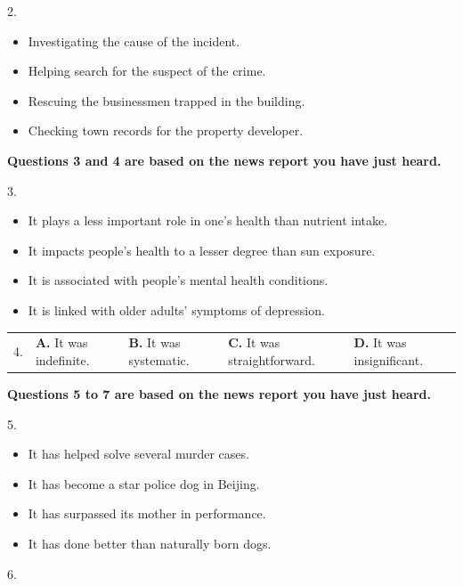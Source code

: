 \documentclass[UTF8,11pt]{ctexart}
\begin{document}
2.


\begin{itemize}[leftmargin=2em,itemsep=.2em,topsep=.4em]\item[A.] Investigating the cause of the incident.
\item[B.] Helping search for the suspect of the crime.
\item[C.] Rescuing the businessmen trapped in the building.
\item[D.] Checking town records for the property developer.
\end{itemize}

\textbf{Questions 3 and 4 are based on the news report you have just heard.}


3.


\begin{itemize}[leftmargin=2em,itemsep=.2em,topsep=.4em]\item[A.] It plays a less important role in one’s health than nutrient intake.
\item[B.] It impacts people’s health to a lesser degree than sun exposure.
\item[C.] It is associated with people’s mental health conditions.
\item[D.] It is linked with older adults’ symptoms of depression.
\end{itemize}

\noindent\begin{tabularx}{\linewidth}{@{}lXXXX@{}}4. & \textbf{A.} It was indefinite. & \textbf{B.} It was systematic. & \textbf{C.} It was straightforward. & \textbf{D.} It was insignificant.\\\end{tabularx}\par

\textbf{Questions 5 to 7 are based on the news report you have just heard.}


5.


\begin{itemize}[leftmargin=2em,itemsep=.2em,topsep=.4em]\item[A.] It has helped solve several murder cases.
\item[B.] It has become a star police dog in Beijing.
\item[C.] It has surpassed its mother in performance.
\item[D.] It has done better than naturally born dogs.
\end{itemize}

6.
\end{document}

